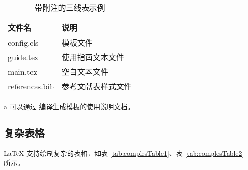 \documentclass[report, twoside, UTF8, AutoFakeBold = 1, AutoFakeSlant, zihao = -4]{config}
\begin{document}
\begin{table}[H]
    \centering
    \caption{带附注的三线表示例}
    \label{tab:three-line-with-note}
    \renewcommand\arraystretch{1.3} %
    \setlength{\tabcolsep}{20pt} %
    \begin{threeparttable}[c]
        \begin{tabular}{ll}
            \toprule[1.5pt]
            \textbf{文件名}           & \textbf{说明}\\
            \midrule[0.8pt]
            config.cls               & 模板文件\\
            guide.tex\tnote{a}       & 使用指南文本文件\\
            main.tex                 & 空白文本文件\\
            references.bib           & 参考文献表样式文件\\
            \bottomrule[1.5pt]
        \end{tabular}
        \begin{tablenotes}
            \item [a] 可以通过  编译生成模板的使用说明文档。
        \end{tablenotes}
    \end{threeparttable}
\end{table}

\subsection{复杂表格}

\LaTeX{} 支持绘制复杂的表格，如表 \ref{tab:complesTable1}、表 \ref{tab:complesTable2} 所示。
\end{document}
